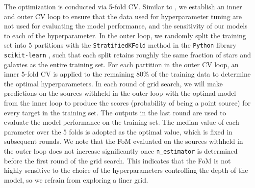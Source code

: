 \documentclass[twocolumn,tighten]{aastex631}
\begin{document}
\begin{CJK*}{UTF8}{gbsn}
The optimization is conducted via 5-fold CV. Similar to , we establish an inner and outer CV loop to ensure that the data used for hyperparameter tuning are not used for evaluating the model performance, and the sensitivity of our models to each of the hyperparameter. In the outer loop, we randomly split the training set into 5 partitions with the \texttt{StratifiedKFold} method in the \texttt{Python} library \texttt{scikit-learn} \citep{scikit-learn}, such that each split retains roughly the same fraction of stars and galaxies as the entire training set. For each partition in the outer CV loop, an inner 5-fold CV is applied to the remaining 80\% of the training data to determine the optimal hyperparameters. 
In each round of grid search, we will make predictions on the sources withheld in the outer loop with the optimal model from the inner loop to produce the scores (probability of being a point source) for every target in the training set. The outputs in the last round are used to evaluate the model performance on the training set. 
The median value of each parameter over the 5 folds is adopted as the optimal value, which is fixed in subsequent rounds. 
We note that the FoM evaluated on the sources withheld in the outer loop does not increase significantly once \texttt{n\_estimator} is determined before the first round of the grid search.
This indicates that the FoM is not highly sensitive to the choice of the hyperparameters controlling the depth of the model, so we refrain from exploring a finer grid.


\end{CJK*}
\end{document}
